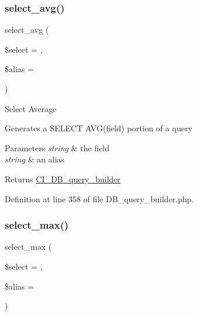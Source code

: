\mbox{\label{class_c_i___d_b__query__builder_a0377f6833e394c977823e21413772761}} 
\subsubsection{\texorpdfstring{select\_avg()}{select\_avg()}}
{\footnotesize\ttfamily select\+\_\+avg (\begin{DoxyParamCaption}\item[{}]{\$select = {\ttfamily \textquotesingle{}\textquotesingle{}},  }\item[{}]{\$alias = {\ttfamily \textquotesingle{}\textquotesingle{}} }\end{DoxyParamCaption})}

Select Average

Generates a S\+E\+L\+E\+CT A\+V\+G(field) portion of a query


\begin{DoxyParams}{Parameters}
{\em string} & the field \\
\hline
{\em string} & an alias \\
\hline
\end{DoxyParams}
\begin{DoxyReturn}{Returns}
\mbox{\hyperlink{class_c_i___d_b__query__builder}{C\+I\+\_\+\+D\+B\+\_\+query\+\_\+builder}} 
\end{DoxyReturn}


Definition at line 358 of file D\+B\+\_\+query\+\_\+builder.\+php.

\mbox{\label{class_c_i___d_b__query__builder_a4eac30ba8703ba8f62664e3b4ea1a177}} 
\subsubsection{\texorpdfstring{select\_max()}{select\_max()}}
{\footnotesize\ttfamily select\+\_\+max (\begin{DoxyParamCaption}\item[{}]{\$select = {\ttfamily \textquotesingle{}\textquotesingle{}},  }\item[{}]{\$alias = {\ttfamily \textquotesingle{}\textquotesingle{}} }\end{DoxyParamCaption})}

